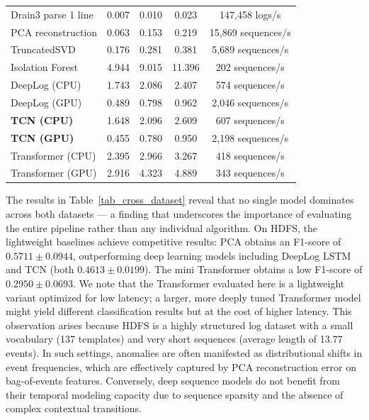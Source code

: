 \documentclass[conference]{IEEEtran}
\begin{document}
\begin{table}[!t]
\begin{minipage}[t]{0.48\textwidth}
\begin{center}
\begin{tabular}{lcccc}
\midrule
Drain3 parse 1 line & 0.007 & 0.010 & 0.023 & 147,458 logs/s \\
PCA reconstruction & 0.063 & 0.153 & 0.219 & 15,869 sequences/s \\
TruncatedSVD & 0.176 & 0.281 & 0.381 & 5,689 sequences/s \\
Isolation Forest & 4.944 & 9.015 & 11.396 & 202 sequences/s \\
DeepLog (CPU) & 1.743 & 2.086 & 2.407 & 574 sequences/s \\
DeepLog (GPU) & 0.489 & 0.798 & 0.962 & 2,046 sequences/s \\
\textbf{TCN (CPU)} & 1.648 & 2.096 & 2.609 & 607 sequences/s \\
\textbf{TCN (GPU)} & 0.455 & 0.780 & 0.950 & 2,198 sequences/s \\
Transformer (CPU) & 2.395 & 2.966 & 3.267 & 418 sequences/s \\
Transformer (GPU) & 2.916 & 4.323 & 4.889 & 343 sequences/s \\
\bottomrule
\end{tabular}
\label{tab_latency}
\end{center}
\end{minipage}
\end{table}


The results in Table~\ref{tab_cross_dataset} reveal that no single model dominates across both datasets — a finding that underscores the importance of evaluating the entire pipeline rather than any individual algorithm. On HDFS, the lightweight baselines achieve competitive results: PCA obtains an F1-score of $0.5711 \pm 0.0944$, outperforming deep learning models including DeepLog LSTM and TCN (both $0.4613 \pm 0.0199$). The mini Transformer obtains a low F1-score of $0.2950 \pm 0.0693$. We note that the Transformer evaluated here is a lightweight variant optimized for low latency; a larger, more deeply tuned Transformer model might yield different classification results but at the cost of higher latency. This observation arises because HDFS is a highly structured log dataset with a small vocabulary (137 templates) and very short sequences (average length of 13.77 events). In such settings, anomalies are often manifested as distributional shifts in event frequencies, which are effectively captured by PCA reconstruction error on bag-of-events features. Conversely, deep sequence models do not benefit from their temporal modeling capacity due to sequence sparsity and the absence of complex contextual transitions.
\end{document}
